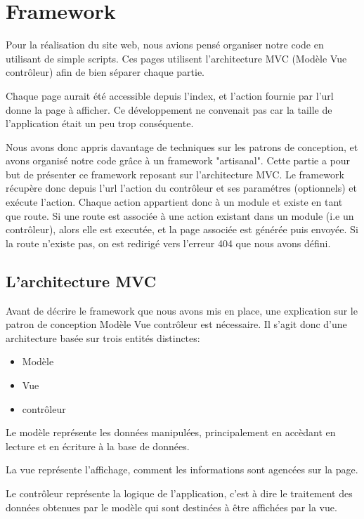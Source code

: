     \section{Framework}

Pour la réalisation du site web, nous avions pensé organiser notre code en utilisant de simple scripts.
Ces pages utilisent l'architecture MVC (Modèle Vue contrôleur) afin de bien séparer chaque partie.

Chaque page aurait été accessible depuis l'index, et l'action fournie par l'url donne la page à afficher.
Ce développement ne convenait pas car la taille de l'application était un peu trop conséquente.

Nous avons donc appris davantage de techniques sur les patrons de conception, et avons organisé notre code
grâce à un framework "artisanal". Cette partie a pour but de présenter ce framework reposant sur l'architecture MVC.
Le framework récupère donc depuis l'url l'action du contrôleur et ses paramétres (optionnels) et exécute l'action.
Chaque action appartient donc à un module et existe en tant que route. Si une route est associée à une action existant dans
un module (i.e un contrôleur), alors elle est executée, et la page associée est générée puis envoyée.
Si la route n'existe pas, on est redirigé vers l'erreur 404 que nous avons défini.

        \subsection{L'architecture MVC}

Avant de décrire le framework que nous avons mis en place, une explication sur le patron de conception Modèle Vue contrôleur
est nécessaire. Il s'agit donc d'une architecture basée sur trois entités distinctes:

    \begin{itemize}
    \item Modèle
    \item Vue
    \item contrôleur
    \end{itemize}

Le modèle représente les données manipulées, principalement en accèdant en lecture et en écriture à la base de données.

La vue représente l'affichage, comment les informations sont agencées sur la page.

Le contrôleur représente la logique de l'application, c'est à dire le traitement des données obtenues par le modèle
qui sont destinées à être affichées par la vue.

